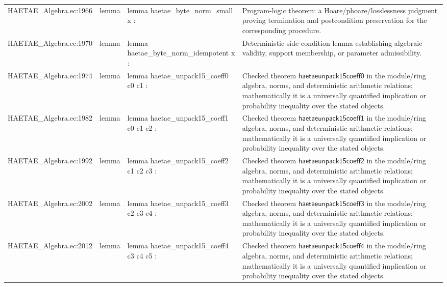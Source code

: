 \documentclass[10pt]{article}
\begin{document}
\begin{longtable}{L{0.11\textwidth}L{0.055\textwidth}L{0.385\textwidth}L{0.41\textwidth}}
HAETAE\_\allowbreak{}Algebra.\allowbreak{}ec:\allowbreak{}1966 & lemma & {\ttfamily\scriptsize lemma haetae\_\allowbreak{}byte\_\allowbreak{}norm\_\allowbreak{}small x :} & Program-logic theorem: a Hoare/phoare/losslessness judgment proving termination and postcondition preservation for the corresponding procedure. \\
HAETAE\_\allowbreak{}Algebra.\allowbreak{}ec:\allowbreak{}1970 & lemma & {\ttfamily\scriptsize lemma haetae\_\allowbreak{}byte\_\allowbreak{}norm\_\allowbreak{}idempotent x :} & Deterministic side-condition lemma establishing algebraic validity, support membership, or parameter admissibility. \\
HAETAE\_\allowbreak{}Algebra.\allowbreak{}ec:\allowbreak{}1974 & lemma & {\ttfamily\scriptsize lemma haetae\_\allowbreak{}unpack15\_\allowbreak{}coeff0 c0 c1 :} & Checked theorem $\mathsf{haetaeunpack15coeff0}$ in the module/ring algebra, norms, and deterministic arithmetic relations; mathematically it is a universally quantified implication or probability inequality over the stated objects. \\
HAETAE\_\allowbreak{}Algebra.\allowbreak{}ec:\allowbreak{}1982 & lemma & {\ttfamily\scriptsize lemma haetae\_\allowbreak{}unpack15\_\allowbreak{}coeff1 c0 c1 c2 :} & Checked theorem $\mathsf{haetaeunpack15coeff1}$ in the module/ring algebra, norms, and deterministic arithmetic relations; mathematically it is a universally quantified implication or probability inequality over the stated objects. \\
HAETAE\_\allowbreak{}Algebra.\allowbreak{}ec:\allowbreak{}1992 & lemma & {\ttfamily\scriptsize lemma haetae\_\allowbreak{}unpack15\_\allowbreak{}coeff2 c1 c2 c3 :} & Checked theorem $\mathsf{haetaeunpack15coeff2}$ in the module/ring algebra, norms, and deterministic arithmetic relations; mathematically it is a universally quantified implication or probability inequality over the stated objects. \\
HAETAE\_\allowbreak{}Algebra.\allowbreak{}ec:\allowbreak{}2002 & lemma & {\ttfamily\scriptsize lemma haetae\_\allowbreak{}unpack15\_\allowbreak{}coeff3 c2 c3 c4 :} & Checked theorem $\mathsf{haetaeunpack15coeff3}$ in the module/ring algebra, norms, and deterministic arithmetic relations; mathematically it is a universally quantified implication or probability inequality over the stated objects. \\
HAETAE\_\allowbreak{}Algebra.\allowbreak{}ec:\allowbreak{}2012 & lemma & {\ttfamily\scriptsize lemma haetae\_\allowbreak{}unpack15\_\allowbreak{}coeff4 c3 c4 c5 :} & Checked theorem $\mathsf{haetaeunpack15coeff4}$ in the module/ring algebra, norms, and deterministic arithmetic relations; mathematically it is a universally quantified implication or probability inequality over the stated objects. \\

\end{longtable}
\end{document}
